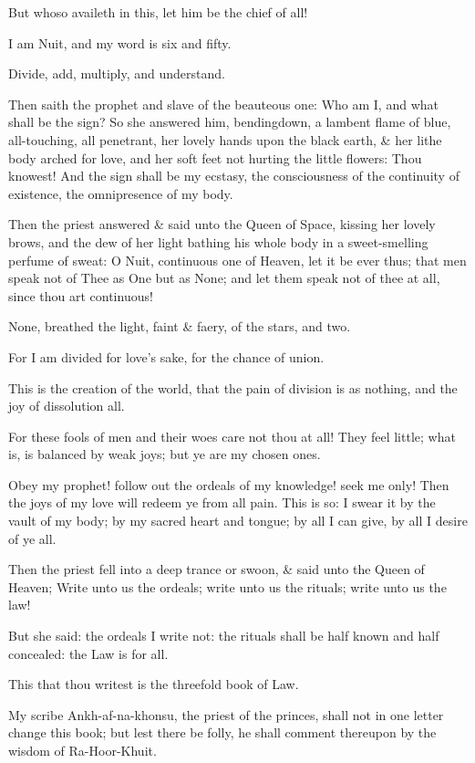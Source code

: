 But whoso availeth in this, let him be the chief of all!

I am Nuit, and my word is six and fifty.

Divide, add, multiply, and understand.

Then saith the prophet and slave of the beauteous one: Who am I, and what shall be the sign? So she answered him, bendingdown, a lambent flame of blue, all-touching, all penetrant, her lovely hands upon the black earth, \& her lithe body arched for love, and her soft feet not hurting the little flowers: Thou knowest! And the sign shall be my ecstasy, the consciousness of the continuity of existence, the omnipresence of my body.

Then the priest answered \& said unto the Queen of Space, kissing her lovely brows, and the dew of her light bathing his whole body in a sweet-smelling perfume of sweat: O Nuit, continuous one of Heaven, let it be ever thus; that men speak not of Thee as One but as None; and let them speak not of thee at all, since thou art continuous!

None, breathed the light, faint \& faery, of the stars, and two.

For I am divided for love's sake, for the chance of union.

This is the creation of the world, that the pain of division is as nothing, and the joy of dissolution all.

For these fools of men and their woes care not thou at all! They feel little; what is, is balanced by weak joys; but ye are my chosen ones.

Obey my prophet! follow out the ordeals of my knowledge! seek me only! Then the joys of my love will redeem ye from all pain. This is so: I swear it by the vault of my body; by my sacred heart and tongue; by all I can give, by all I desire of ye all.

Then the priest fell into a deep trance or swoon, \& said unto the Queen of Heaven; Write unto us the ordeals; write unto us the rituals; write unto us the law!

But she said: the ordeals I write not: the rituals shall be half known and half concealed: the Law is for all.

This that thou writest is the threefold book of Law.

My scribe Ankh-af-na-khonsu, the priest of the princes, shall not in one letter change this book; but lest there be folly, he shall comment thereupon by the wisdom of Ra-Hoor-Khuit.

